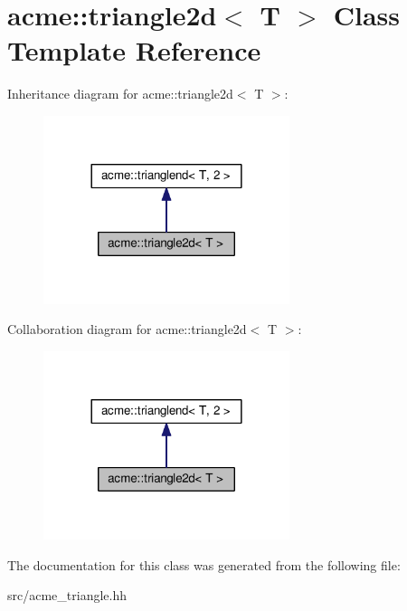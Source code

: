 \hypertarget{classacme_1_1triangle2d}{}\section{acme\+:\+:triangle2d$<$ T $>$ Class Template Reference}
\label{classacme_1_1triangle2d}


Inheritance diagram for acme\+:\+:triangle2d$<$ T $>$\+:
\nopagebreak
\begin{figure}[H]
\begin{center}
\leavevmode
\includegraphics[width=204pt]{d8/dce/classacme_1_1triangle2d__inherit__graph}
\end{center}
\end{figure}


Collaboration diagram for acme\+:\+:triangle2d$<$ T $>$\+:
\nopagebreak
\begin{figure}[H]
\begin{center}
\leavevmode
\includegraphics[width=204pt]{df/dcb/classacme_1_1triangle2d__coll__graph}
\end{center}
\end{figure}


The documentation for this class was generated from the following file\+:\begin{DoxyCompactItemize}
\item 
src/acme\+\_\+triangle.\+hh\end{DoxyCompactItemize}
